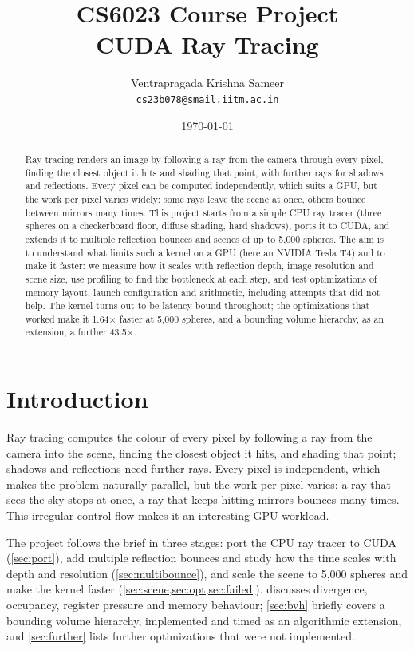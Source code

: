 \documentclass[11pt,a4paper]{article}
\title{%
  \textbf{CS6023 Course Project} \\[0.3em]
  \Large CUDA Ray Tracing
}
\author{%
  Ventrapragada Krishna Sameer \\ \texttt{cs23b078@smail.iitm.ac.in}
}
\date{\today}
\begin{document}
\maketitle

\begin{abstract}

Ray tracing renders an image by following a ray from the camera through every pixel, finding the
closest object it hits and shading that point, with further rays for shadows and reflections. Every
pixel can be computed independently, which suits a GPU, but the work per pixel varies widely: some
rays leave the scene at once, others bounce between mirrors many times. This project starts from a
simple CPU ray tracer (three spheres on a checkerboard floor, diffuse shading, hard shadows), ports
it to CUDA, and extends it to multiple reflection bounces and scenes of up to 5,000 spheres. The aim
is to understand what limits such a kernel on a GPU (here an NVIDIA Tesla T4) and to make it faster:
we measure how it scales with reflection depth, image resolution and scene size, use profiling to
find the bottleneck at each step, and test optimizations of memory layout, launch configuration and
arithmetic, including attempts that did not help. The kernel turns out to be latency-bound
throughout; the optimizations that worked make it 1.64$\times$ faster at 5,000 spheres, and a
bounding volume hierarchy, as an extension, a further 43.5$\times$.

\end{abstract}

\section{Introduction}
\label{sec:intro}

Ray tracing computes the colour of every pixel by following a ray from the camera into the scene,
finding the closest object it hits, and shading that point; shadows and reflections need further
rays. Every pixel is independent, which makes the problem naturally parallel, but the work per pixel
varies: a ray that sees the sky stops at once, a ray that keeps hitting mirrors bounces many times.
This irregular control flow makes it an interesting GPU workload.

The project follows the brief in three stages: port the CPU ray tracer to CUDA (\cref{sec:port}),
add multiple reflection bounces and study how the time scales with depth and resolution
(\cref{sec:multibounce}), and scale the scene to 5,000 spheres and make the kernel faster
(\cref{sec:scene,sec:opt,sec:failed}).  discusses divergence, occupancy,
register pressure and memory behaviour; \cref{sec:bvh} briefly covers a bounding volume hierarchy,
implemented and timed as an algorithmic extension, and \cref{sec:further} lists further optimizations that were not
implemented.
\end{document}
